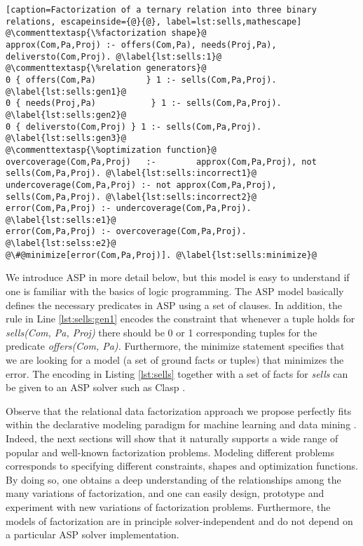\begin{lstlisting}[caption=Factorization of a ternary relation into three binary relations, escapeinside={@}{@}, label=lst:sells,mathescape] 
@\commenttextasp{\%factorization shape}@
approx(Com,Pa,Proj) :- offers(Com,Pa), needs(Proj,Pa), deliversto(Com,Proj). @\label{lst:sells:1}@
@\commenttextasp{\%relation generators}@
0 { offers(Com,Pa)          } 1 :- sells(Com,Pa,Proj). @\label{lst:sells:gen1}@
0 { needs(Proj,Pa)           } 1 :- sells(Com,Pa,Proj). @\label{lst:sells:gen2}@
0 { deliversto(Com,Proj) } 1 :- sells(Com,Pa,Proj). @\label{lst:sells:gen3}@
@\commenttextasp{\%optimization function}@
overcoverage(Com,Pa,Proj)   :-        approx(Com,Pa,Proj), not sells(Com,Pa,Proj). @\label{lst:sells:incorrect1}@
undercoverage(Com,Pa,Proj) :- not approx(Com,Pa,Proj),        sells(Com,Pa,Proj). @\label{lst:sells:incorrect2}@
error(Com,Pa,Proj) :- undercoverage(Com,Pa,Proj). @\label{lst:sells:e1}@
error(Com,Pa,Proj) :- overcoverage(Com,Pa,Proj). @\label{lst:selss:e2}@
@\#@minimize[error(Com,Pa,Proj)]. @\label{lst:sells:minimize}@
\end{lstlisting}

We introduce ASP in more detail below, but this model is easy to understand if one is familiar with the basics of logic programming. The ASP model basically defines the necessary predicates in ASP using a set of clauses. In addition, the rule in Line \ref{lst:sells:gen1} encodes the constraint that whenever a tuple holds for \textit{sells(Com, Pa, Proj)}
there should be 0 or 1 corresponding tuples for the predicate \textit{offers(Com, Pa).}
Furthermore, the minimize statement specifies that we are looking for a model (a set of ground facts or tuples) that minimizes the error.  The encoding in Listing  \ref{lst:sells} together with a set of facts for \textit{sells}
can be given to an ASP solver such as Clasp \parencite{gebser2011potassco}. %


Observe that the relational data factorization approach we propose perfectly fits within the declarative modeling paradigm for machine learning and data mining \parencite{DeRaedtECML12}.  Indeed, the next sections will show that it naturally supports a wide range of popular and well-known factorization problems. 
Modeling different problems corresponds to specifying different constraints, shapes and optimization functions.
By doing so, one obtains a deep understanding of the relationships among the many variations of factorization, 
and one can easily design, prototype and experiment with new variations of factorization problems. 
Furthermore, the models of factorization are in principle solver-independent and do not depend on a particular ASP solver implementation.   

